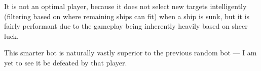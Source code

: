 		It is not an optimal player, because it does not select new targets intelligently (filtering based on where remaining ships can fit) when a ship is sunk, but it is fairly performant due to the gameplay being inherently heavily based on sheer luck.
		
		This smarter bot is naturally vastly superior to the previous random bot --- I am yet to see it be defeated by that player.

%















